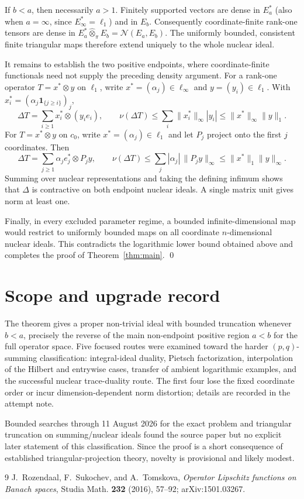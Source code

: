 \documentclass[11pt,a4paper]{article}
\newcommand{\Nuc}{\mathcal N}
\newcommand{\Dlt}{\Delta}
\begin{document}
If $b<a$, then necessarily $a>1$.  Finitely supported vectors are dense in
$E_a^*$ (also when $a=\infty$, since $E_\infty^*=\ell_1$) and in $E_b$.
Consequently coordinate-finite rank-one tensors are dense in
$E_a^*\widehat\otimes_\pi E_b=\Nuc(E_a,E_b)$.  The uniformly bounded,
consistent finite triangular maps therefore extend uniquely to the whole
nuclear ideal.

It remains to establish the two positive endpoints, where coordinate-finite
functionals need not supply the preceding density argument.  For a rank-one
operator $T=x^*\otimes y$ on $\ell_1$, write $x^*=(\alpha_j)\in\ell_\infty$
and $y=(y_i)\in\ell_1$.  With
$x_i^*=(\alpha_j\mathbf 1_{\{j\ge i\}})_j$,
\[
 \Dlt T=\sum_{i\ge1}x_i^*\otimes (y_ie_i),\qquad
 \nu(\Dlt T)\le\sum_i\|x_i^*\|_\infty|y_i|
 \le\|x^*\|_\infty\|y\|_1.
\]
For $T=x^*\otimes y$ on $c_0$, write
$x^*=(\alpha_j)\in\ell_1$ and let $P_j$ project onto the first $j$
coordinates.  Then
\[
 \Dlt T=\sum_{j\ge1}\alpha_j e_j^*\otimes P_jy,\qquad
 \nu(\Dlt T)\le\sum_j|\alpha_j|\,\|P_jy\|_\infty
 \le\|x^*\|_1\|y\|_\infty.
\]
Summing over nuclear representations and taking the defining infimum shows
that $\Dlt$ is contractive on both endpoint nuclear ideals.  A single matrix
unit gives norm at least one.

Finally, in every excluded parameter regime, a bounded infinite-dimensional
map would restrict to uniformly bounded maps on all coordinate
$n$-dimensional nuclear ideals.  This contradicts the logarithmic lower
bound obtained above and completes the proof of
Theorem~\ref{thm:main}. \qed

\section*{Scope and upgrade record}
The theorem gives a proper non-trivial ideal with bounded truncation whenever
$b<a$, precisely the reverse of the main non-endpoint positive region
$a<b$ for the full operator space.  Five focused routes were examined toward
the harder $(p,q)$-summing classification: integral-ideal duality, Pietsch
factorization, interpolation of the Hilbert and entrywise cases, transfer of
ambient logarithmic examples, and the successful nuclear trace-duality
route.  The first four lose the fixed coordinate order or incur
dimension-dependent norm distortion; details are recorded in the attempt
note.

Bounded searches through 11 August 2026 for the exact problem and triangular
truncation on summing/nuclear ideals found the source paper but no explicit
later statement of this classification.  Since the proof is a short
consequence of established triangular-projection theory, novelty is
provisional and likely modest.

\begin{thebibliography}{9}
J.~Rozendaal, F.~Sukochev, and A.~Tomskova,
\emph{Operator Lipschitz functions on Banach spaces},
Studia Math. \textbf{232} (2016), 57--92; arXiv:1501.03267.
\end{thebibliography}
\end{document}
